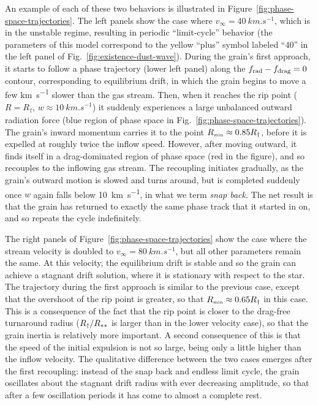 An example of each of these two behaviors is illustrated in
Figure~\ref{fig:phase-space-trajectories}.  The left panels show the
case where \(v_\infty = \SI{40}{km.s^{-1}}\), which is in the unstable
regime, resulting in periodic ``limit-cycle'' behavior (the parameters
of this model correspond to the yellow ``plus'' symbol labeled ``40''
in the left panel of Fig.~\ref{fig:existence-dust-wave}).  During the
grain's first approach, it starts to follow a phase trajectory (lower
left panel) along the \(f_{\text{rad}} - f_{\text{drag}} = 0\) contour, corresponding to
equilibrium drift, in which the grain begins to move a few
\si{km.s^{-1}} slower than the gas stream.  Then, when it reaches the
rip point (\(R = R_\dag\), \(w \approx \SI{10}{km.s^{-1}}\)) it suddenly
experiences a large unbalanced outward radiation force (blue region of
phase space in Fig.~\ref{fig:phase-space-trajectories}). The grain's
inward momentum carries it to the point \(R_{\scriptscriptstyle\text{min}} \approx 0.85 R_\dag\), before
it is expelled at roughly twice the inflow speed.  However, after
moving outward, it finds itself in a drag-dominated region of phase
space (red in the figure), and so recouples to the inflowing gas
stream.  The recoupling initiates gradually, as the grain's outward
motion is slowed and turns around, but is completed suddenly once
\(w\) again falls below \SI{10}{km.s^{-1}}, in what we term
\textit{snap back}. The net result is that the grain has returned to
exactly the same phase track that it started in on, and so repeats the
cycle indefinitely.

The right panels of Figure~\ref{fig:phase-space-trajectories} show the
case where the stream velocity is doubled to
\(v_\infty = \SI{80}{km.s^{-1}}\), but all other parameters remain the
same.  At this velocity, the equilibrium drift is stable and so the
grain can achieve a stagnant drift solution, where it is stationary
with respect to the star.  The trajectory during the first approach is
similar to the previous case, except that the overshoot of the rip
point is greater, so that \(R_{\scriptscriptstyle\text{min}} \approx 0.65 R_\dag\) in this case.  This is
a consequence of the fact that the rip point is closer to the
drag-free turnaround radius (\(R_\dag / R_{**}\) is larger than in
the lower velocity case), so that the grain inertia is relatively more
important.  A second consequence of this is that the speed of the
initial expulsion is not so large, being only a little higher than the
inflow velocity.  The qualitative difference between the two cases
emerges after the first recoupling: instead of the snap back and
endless limit cycle, the grain oscillates about the stagnant drift
radius with ever decreasing amplitude, so that after a few oscillation
periods it has come to almost a complete rest.

